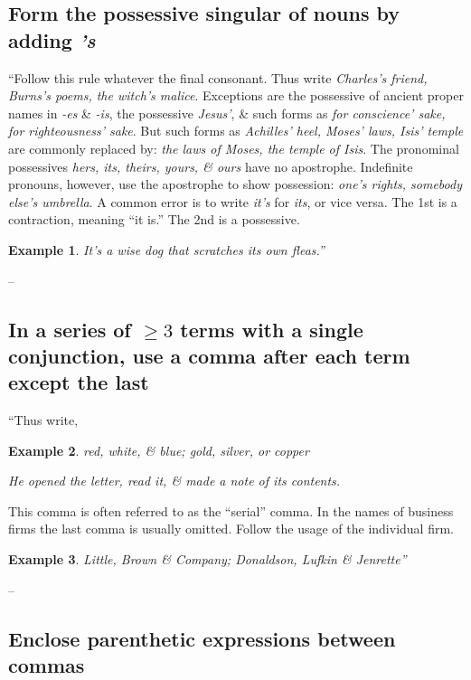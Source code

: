 \documentclass[oneside]{book}
\numberwithin{equation}{section}
\newtheorem{example}{Example}[chapter]
\begin{document}
\subsection{Form the possessive singular of nouns by adding \textit{'s}}
``Follow this rule whatever the final consonant. Thus write \textit{Charles's friend, Burns's poems, the witch's malice}. Exceptions are the possessive of ancient proper names in \textit{-es} \& \textit{-is}, the possessive \textit{Jesus'}, \& such forms as \textit{for conscience' sake, for righteousness' sake}. But such forms as \textit{Achilles' heel, Moses' laws, Isis' temple} are commonly replaced by: \textit{the laws of Moses, the temple of Isis}. The pronominal possessives \textit{hers, its, theirs, yours, \& ours} have no apostrophe. Indefinite pronouns, however, use the apostrophe to show possession: \textit{one's rights, somebody else's umbrella}. A common error is to write \textit{it's} for \textit{its}, or vice versa. The 1st is a contraction, meaning ``it is.'' The 2nd is a possessive.

\begin{example}
	It's a wise dog that scratches its own fleas.''
\end{example}
-- \cite[Chap. 1, Sect. 1, p. 14]{Strunk_White2019}

\subsection{In a series of $\ge 3$ terms with a single conjunction, use a comma after each term except the last}
``Thus write,

\begin{example}
	red, white, \& blue; gold, silver, or copper
	
	He opened the letter, read it, \& made a note of its contents.
\end{example}
This comma is often referred to as the ``serial'' comma. In the names of business firms the last comma is usually omitted. Follow the usage of the individual firm.

\begin{example}
	Little, Brown \& Company; Donaldson, Lufkin \& Jenrette''
\end{example}
-- \cite[Chap. 1, Sect. 2, p. 15]{Strunk_White2019}

\subsection{Enclose parenthetic expressions between commas}
\end{document}
